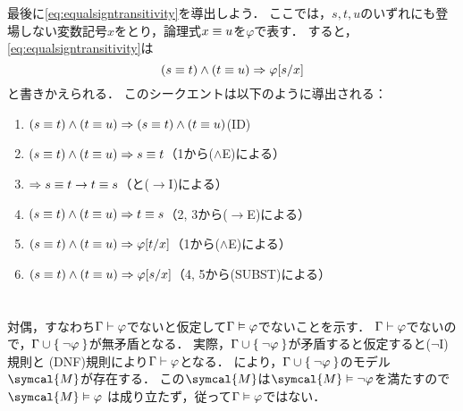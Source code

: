 最後に\cref{eq:equalsigntransitivity}を導出しよう．
ここでは，\(s, t, u\)のいずれにも登場しない変数記号\(x\)をとり，論理式\(x \equiv u\)を\(\varphi\)で表す．
すると，\cref{eq:equalsigntransitivity}は
\begin{equation*}
	\paren{s \objeq t} \land \paren{t \objeq u} \sequent \subst{\varphi}{s/x}
\end{equation*}
と書きかえられる．
このシークエントは以下のように導出される：
\begin{enumerate}
	\item \(\paren{s \objeq t} \land \paren{t \objeq u} \sequent \paren{s \objeq t} \land \paren{t \objeq u}\)\quad (ID)
	\item \(\paren{s \objeq t} \land \paren{t \objeq u} \sequent s \objeq t\)\quad （1から(\(\land\)E)による）
	\item \(\Rightarrow s \equiv t \to t \equiv s\)\quad （と(\(\to\)I)による）
	\item \(\paren{s \objeq t} \land \paren{t \objeq u} \sequent t \objeq s\)\quad （2, 3から(\(\to\)E)による）
	\item \(\paren{s \objeq t} \land \paren{t \objeq u} \sequent \subst{\varphi}{t/x}\)\quad （1から(\(\land\)E)による）
	\item \(\paren{s \objeq t} \land \paren{t \objeq u} \sequent \subst{\varphi}{s/x}\)\quad （4, 5から(SUBST)による）
\end{enumerate}

\section*{}

\subsection*{}

対偶，すなわち\(\Gamma \vdash \varphi\)でないと仮定して\(\Gamma \vDash \varphi\)でないことを示す．
\(\Gamma \vdash \varphi\)でないので，\(\Gamma \cup \Set{\lnot \varphi}\)が無矛盾となる．
実際，\(\Gamma \cup \Set{\lnot \varphi}\)が矛盾すると仮定すると(\(\lnot\)I)規則と
(DNF)規則により\(\Gamma \vdash \varphi\)となる．
により，\(\Gamma \cup \Set{\lnot \varphi}\)のモデル\(\symcal{M}\)が存在する．
この\(\symcal{M}\)は\(\symcal{M} \satisfy \lnot \varphi\)を満たすので\(\symcal{M} \satisfy \varphi\)
は成り立たず，従って\(\Gamma \vDash \varphi\)ではない．